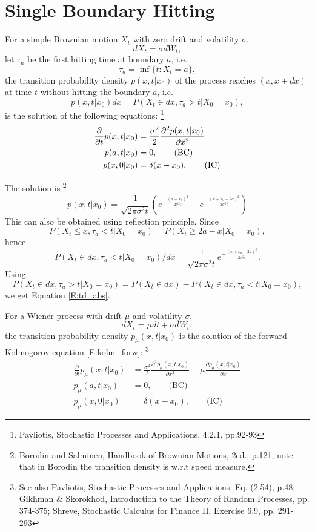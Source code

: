 \section{Single Boundary Hitting}

For a simple Brownian motion $X_t$ with zero drift and volatility $\sigma$,
\[
  dX_t = \sigma dW_t,
\]
let $\tau_a$ be the first hitting time at boundary $a$, i.e.
\[
  \tau_a = \inf\{t: X_t =a \},
\]
the transition probability density $p(x,t|x_0)$ of the process reaches 
$(x,x+dx)$ at time $t$ without hitting the boundary $a$, i.e.
\[
  p(x,t|x_0) dx=P(X_t\in dx, \tau_a>t | X_0=x_0),
\]
is the solution of the following equations:
\footnote{Pavliotis, Stochastic Processes and Applications, 4.2.1, pp.92-93}
\begin{align} \label{E:fp_nodrift}
  \frac{\partial}{\partial t} p(x,t|x_0)
    &= \frac{\sigma^2}{2} \frac{\partial^2 p(x,t|x_0)}{\partial x^2} \notag \\
  p(a,t|x_0) &= 0,  \qquad \text{(BC)}  \notag \\
  p(x,0|x_0) &= \delta (x-x_0),  \qquad \text{(IC)}  
\end{align}

The solution is
\footnote{Borodin and Salminen, Handbook of Brownian Motions, 2ed., p.121,
note that in Borodin the transition density is w.r.t speed measure.}
\begin{equation} \label{E:td_abs}
  p(x,t|x_0) = \frac{1}{\sqrt{2\pi \sigma^2 t}} 
    \left(  e^{-\frac{(x-x_0)^2}{2\sigma^2 t}} 
          - e^{-\frac{(x+x_0-2a)^2}{2\sigma^2 t}} \right)
\end{equation}
This can also be obtained using reflection principle. Since
\[
  P(X_t\le x, \tau_a<t | X_0=x_0) = P(X_t\ge 2a-x | X_0=x_0),
\]
hence
\[
  P(X_t\in dx, \tau_a<t | X_0=x_0) / dx
    = \frac{1}{\sqrt{2\pi \sigma^2 t}} e^{-\frac{(x+x_0-2a)^2}{2\sigma^2 t}}.
\]
Using
\[
P(X_t\in dx, \tau_a>t | X_0=x_0) 
   = P(X_t\in dx) - P(X_t\in dx, \tau_a<t | X_0=x_0),
\]
we get Equation \ref{E:td_abs}.

For a Wiener process with drift $\mu$ and volatility $\sigma$, 
\[
  dX_t = \mu dt + \sigma dW_t,
\]
the transition probability density $p_{\mu}(x,t|x_0)$ is the solution of the
forward Kolmogorov equation \ref{E:kolm_forw}:
\footnote{See also Pavliotis, Stochastic Processes and Applications, Eq. (2.54), p.48;
  Gikhman \& Skorokhod, Introduction to the Theory of Random Processes, pp. 374-375;
  Shreve, Stochastic Calculus for Finance II, Exercise 6.9, pp. 291-293}
\begin{align*}
  \frac{\partial}{\partial t} p_{\mu}(x,t|x_0)
    &= \frac{\sigma^2}{2} \frac{\partial^2 p_{\mu}(x,t|x_0)}{\partial x^2}   
     - \mu \frac{\partial p_{\mu}(x,t|x_0)}{\partial x}   \\
  p_{\mu}(a,t|x_0) &= 0,  \qquad \text{(BC)}  \\
  p_{\mu}(x,0|x_0) &= \delta (x-x_0),  \qquad \text{(IC)}  
\end{align*}

